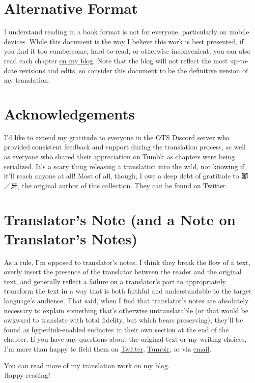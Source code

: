 \section*{Alternative Format}
I understand reading in a book format is not for everyone, particularly on mobile devices. While this document is the way I believe this work is best presented, if you find it too cumbersome, hard-to-read, or otherwise inconvenient, you can also read each chapter \href{https://lynne.bearblog.dev/blog/?q=octo84}{on my blog}. Note that the blog will not reflect the most up-to-date revisions and edits, so consider this document to be the definitive version of my translation.

\section*{Acknowledgements}
I'd like to extend my gratitude to everyone in the OTS Discord server who provided consistent feedback and support during the translation process, as well as everyone who shared their appreciation on Tumblr as chapters were being serialized. It's a scary thing releasing a translation into the wild, not knowing if it'll reach anyone at all! Most of all, though, I owe a deep debt of gratitude to 鰤／牙, the original author of this collection. They can be found on \href{https://twitter.com/kiva_blitz}{Twitter}.

\section*{Translator's Note (and a Note on Translator's Notes)}
As a rule, I'm opposed to translator's notes. I think they break the flow of a text, overly insert the presence of the translator between the reader and the original text, and generally reflect a failure on a translator's part to appropriately transform the text in a way that is both faithful and understandable to the target language's audience. That said, when I find that translator's notes are absolutely necessary to explain something that's otherwise untranslatable (or that would be awkward to translate with total fidelity, but which bears preserving), they'll be found as hyperlink-enabled endnotes in their own section at the end of the chapter.
If you have any questions about the original text or my writing choices, I'm more than happy to field them on \href{https://twitter.com/plvpwaa}{Twitter}, \href{https://plvpwaa.tumblr.com}{Tumblr}, or via \href{mailto:plvpwaa@lynnux.org}{email}.

You can read more of my translation work on \href{https://lynne.bearblog.dev}{my blog}.
\\

Happy reading!